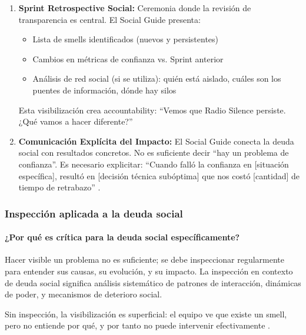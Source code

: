 \begin{enumerate}
Estos indicadores no reemplazan medidas de desempeño técnico, pero complementan el panorama. Un equipo que entrega rápido pero tiene conflictos no resueltos está acumulando deuda social.

\item \textbf{Sprint Retrospective Social:} Ceremonia donde la revisión de transparencia es central. El Social Guide presenta:
\begin{itemize}
\item Lista de smells identificados (nuevos y persistentes)
\item Cambios en métricas de confianza vs. Sprint anterior
\item Análisis de red social (si se utiliza): quién está aislado, cuáles son los puentes de información, dónde hay silos
\end{itemize}

Esta visibilización crea accountability: ``Vemos que Radio Silence persiste. ¿Qué vamos a hacer diferente?''

\item \textbf{Comunicación Explícita del Impacto:} El Social Guide conecta la deuda social con resultados concretos. No es suficiente decir ``hay un problema de confianza''. Es necesario explicitar: ``Cuando falló la confianza en [situación específica], resultó en [decisión técnica subóptima] que nos costó [cantidad] de tiempo de retrabazo'' \cite{saeeda2024nontechnicaldebt}.

\end{enumerate}

\subsubsection{Inspección aplicada a la deuda social}

\paragraph{¿Por qué es crítica para la deuda social específicamente?}

Hacer visible un problema no es suficiente; se debe inspeccionar regularmente para entender sus causas, su evolución, y su impacto. La inspección en contexto de deuda social significa análisis sistemático de patrones de interacción, dinámicas de poder, y mecanismos de deterioro social.

Sin inspección, la visibilización es superficial: el equipo ve que existe un smell, pero no entiende por qué, y por tanto no puede intervenir efectivamente \cite{tamburri2015insights}.

